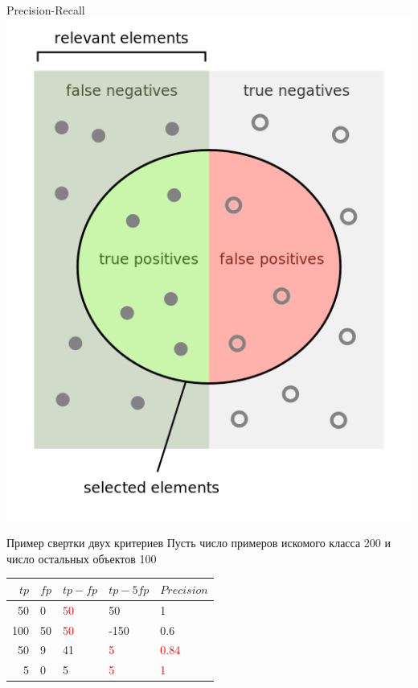 \documentclass[10pt]{beamer}
\begin{document}
\begin{frame}{Precision-Recall}
	\centering
	\includegraphics[width=\textwidth, height=0.9 \textheight, keepaspectratio]{images/precisionrecall}
\end{frame}


\begin{frame}{Пример свертки двух критериев}
	Пусть число примеров искомого класса 200 и число остальных объектов 100\\
	\bigbreak
	\begin{tabular}{|r l|l|l|l|}
	  \hline 
	  $tp$ & $fp$ & $tp-fp$ & $tp-5fp$ & $Precision$\\ 
	  \hline \hline
	  50 & 0 & \textcolor{red}{50} & 50 & 1\\
	  \hline
	  100 & 50 & \textcolor{red}{50} & -150 & 0.6\\
	  \hline \hline
	  50 & 9 & 41 & \textcolor{red}{5} & \textcolor{red}{0.84}\\
	  \hline  
	  5 & 0 & 5 & \textcolor{red}{5} & \textcolor{red}{1}\\  
	  \hline 
	\end{tabular}
\end{frame}
\end{document}
